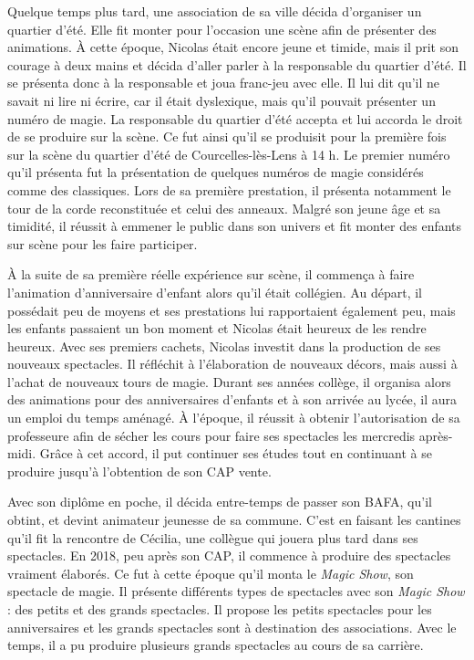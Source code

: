 Quelque temps plus tard, une association de sa ville décida d’organiser un quartier d’été. Elle fit monter pour l’occasion une scène afin de présenter des animations. À cette époque, Nicolas était encore jeune et timide, mais il prit son courage à deux mains et décida d’aller parler à la responsable du quartier d’été. Il se présenta donc à la responsable et joua franc-jeu avec elle. Il lui dit qu’il ne savait ni lire ni écrire, car il était dyslexique, mais qu’il pouvait présenter un numéro de magie. La responsable du quartier d’été accepta et lui accorda le droit de se produire sur la scène. Ce fut ainsi qu’il se produisit pour la première fois sur la scène du quartier d’été de Courcelles-lès-Lens à 14 h. Le premier numéro qu’il présenta fut la présentation de quelques numéros de magie considérés comme des classiques. Lors de sa première prestation, il présenta notamment le tour de la corde reconstituée et celui des anneaux. Malgré son jeune âge et sa timidité, il réussit à emmener le public dans son univers et fit monter des enfants sur scène pour les faire participer.  

À la suite de sa première réelle expérience sur scène, il commença à faire l’animation d’anniversaire d’enfant alors qu’il était collégien. Au départ, il possédait peu de moyens et ses prestations lui rapportaient également peu, mais les enfants passaient un bon moment et Nicolas était heureux de les rendre heureux. Avec ses premiers cachets, Nicolas investit dans la production de ses nouveaux spectacles. Il réfléchit à l’élaboration de nouveaux décors, mais aussi à l’achat de nouveaux tours de magie. Durant ses années collège, il organisa alors des animations pour des anniversaires d’enfants et à son arrivée au lycée, il aura un emploi du temps aménagé. À l’époque, il réussit à obtenir l’autorisation de sa professeure afin de sécher les cours pour faire ses spectacles les mercredis après-midi. Grâce à cet accord, il put continuer ses études tout en continuant à se produire jusqu’à l’obtention de son CAP vente. 

Avec son diplôme en poche, il décida entre-temps de passer son BAFA, qu'il obtint, et devint animateur jeunesse de sa commune. C’est en faisant les cantines qu’il fit la rencontre de Cécilia, une collègue qui jouera plus tard dans ses spectacles. En 2018, peu après son CAP, il commence à produire des spectacles vraiment élaborés. Ce fut à cette époque qu’il monta le \textit{Magic Show}, son spectacle de magie. Il présente différents types de spectacles avec son \textit{Magic Show} : des petits et des grands spectacles. Il propose les petits spectacles pour les anniversaires et les grands spectacles sont à destination des associations. Avec le temps, il a pu produire plusieurs grands spectacles au cours de sa carrière.

